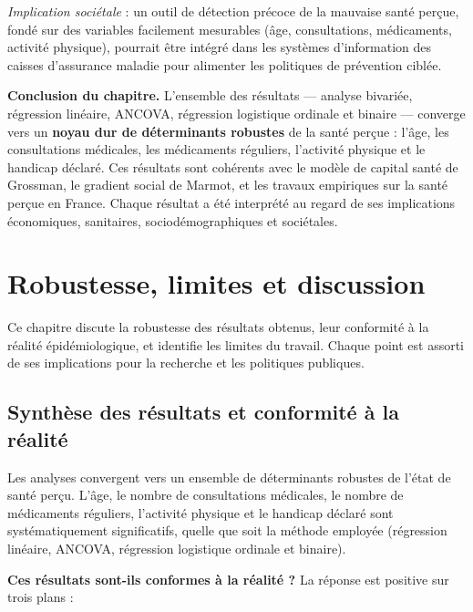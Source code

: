 \documentclass[11pt,a4paper]{memoirerecherche}
\begin{document}
\emph{Implication sociétale} : un outil de détection précoce de la mauvaise santé perçue, fondé sur des variables facilement mesurables (âge, consultations, médicaments, activité physique), pourrait être intégré dans les systèmes d'information des caisses d'assurance maladie pour alimenter les politiques de prévention ciblée.

\bigskip

\textbf{Conclusion du chapitre.} L'ensemble des résultats --- analyse bivariée, régression linéaire, ANCOVA, régression logistique ordinale et binaire --- converge vers un \textbf{noyau dur de déterminants robustes} de la santé perçue : l'âge, les consultations médicales, les médicaments réguliers, l'activité physique et le handicap déclaré. Ces résultats sont cohérents avec le modèle de capital santé de Grossman, le gradient social de Marmot, et les travaux empiriques sur la santé perçue en France. Chaque résultat a été interprété au regard de ses implications économiques, sanitaires, sociodémographiques et sociétales.

\hypertarget{chap-robustesse}{%
\section{Robustesse, limites et discussion}\label{chap-robustesse}}

Ce chapitre discute la robustesse des résultats obtenus, leur conformité à la réalité épidémiologique, et identifie les limites du travail. Chaque point est assorti de ses implications pour la recherche et les politiques publiques.

\hypertarget{synthuxe8se-des-ruxe9sultats-et-conformituxe9-uxe0-la-ruxe9alituxe9}{%
\subsection{Synthèse des résultats et conformité à la réalité}\label{synthuxe8se-des-ruxe9sultats-et-conformituxe9-uxe0-la-ruxe9alituxe9}}

Les analyses convergent vers un ensemble de déterminants robustes de l'état de santé perçu. L'âge, le nombre de consultations médicales, le nombre de médicaments réguliers, l'activité physique et le handicap déclaré sont systématiquement significatifs, quelle que soit la méthode employée (régression linéaire, ANCOVA, régression logistique ordinale et binaire).

\textbf{Ces résultats sont-ils conformes à la réalité ?} La réponse est positive sur trois plans :
\end{document}

